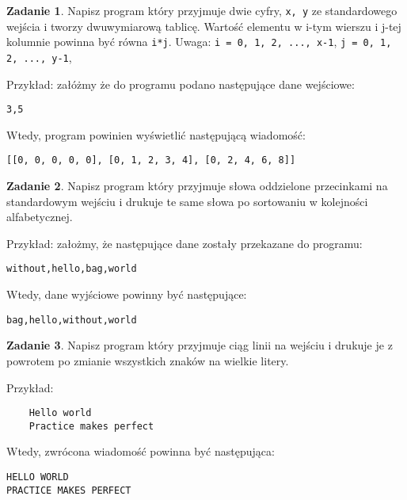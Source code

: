 \documentclass[11pt]{article}
\theoremstyle{definition}
\newtheorem{zadanie}{Zadanie}
\begin{document}
\begin{zadanie}
Napisz program który przyjmuje dwie cyfry, \texttt{x, y} ze standardowego wejścia i tworzy dwuwymiarową tablicę. Wartość elementu  w i-tym wierszu i j-tej kolumnie powinna być równa \texttt{i*j}. Uwaga: \texttt{i = 0, 1, 2, ..., x-1}, \texttt{j = 0, 1, 2, ..., y-1},

Przykład: załóżmy że do programu podano następujące dane wejściowe:
\begin{verbatim}
3,5
\end{verbatim}

Wtedy, program powinien wyświetlić następującą wiadomość:
\begin{verbatim}
[[0, 0, 0, 0, 0], [0, 1, 2, 3, 4], [0, 2, 4, 6, 8]] 
\end{verbatim}	
\end{zadanie}

\begin{zadanie}
Napisz program który przyjmuje słowa oddzielone przecinkami na standardowym wejściu i drukuje te same słowa po sortowaniu w kolejności alfabetycznej.

Przykład: założmy, że następujące dane zostały przekazane do programu:

\begin{verbatim}
without,hello,bag,world
\end{verbatim}
Wtedy, dane wyjściowe powinny być następujące:
\begin{verbatim}
bag,hello,without,world
\end{verbatim}
\end{zadanie}

\begin{zadanie}
Napisz program który przyjmuje ciąg linii na wejściu i drukuje je z powrotem po zmianie wszystkich znaków na wielkie litery.

Przykład: 

\begin{verbatim}
	Hello world
	Practice makes perfect
\end{verbatim}
Wtedy, zwrócona wiadomość powinna być następująca:
\begin{verbatim}
HELLO WORLD
PRACTICE MAKES PERFECT
\end{verbatim}
\end{zadanie}
\end{document}
